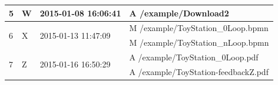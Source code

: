 \begin{table}[bt]
{\begin{tabular}{m{.8cm} m{1.5cm} m{3cm} p{5.8cm}}
5 & W & 2015-01-08 16:06:41 & A /example/Download2\\ \midrule %

\multirow{2}{*}{6} & \multirow{2}{*}{X} & \multirow{2}{*}{2015-01-13 11:47:09} & M /example/ToyStation\_0Loop.bpmn\\
& & & M /example/ToyStation\_nLoop.bpmn \\ \midrule %

\multirow{2}{*}{7} & \multirow{2}{*}{Z} & \multirow{2}{*}{2015-01-16 16:50:29} & A /example/ToyStation\_0Loop.pdf\\
& & & A /example/ToyStation-feedbackZ.pdf\\ \bottomrule %
\end{tabular}\\ 
}
\end{table}



